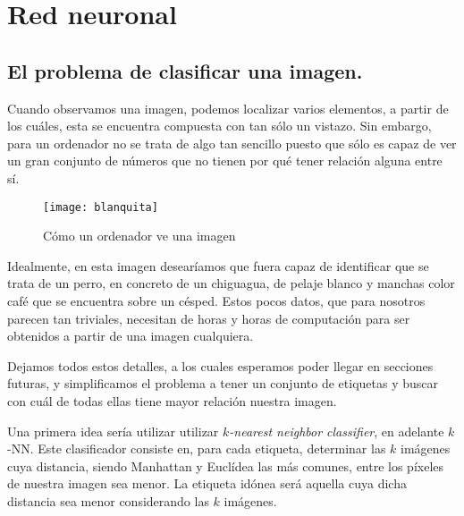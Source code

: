 
\chapter{Red neuronal}
\section{El problema de clasificar una imagen.}

Cuando observamos una imagen, podemos localizar varios elementos, a partir de los cuáles, esta se encuentra compuesta con tan sólo un vistazo. Sin embargo, para un ordenador no se trata de algo tan sencillo puesto que sólo es capaz de ver un gran conjunto de números que no tienen por qué tener relación alguna entre sí.\newline

\begin{figure}[htpb]
  \centering
  \texttt{[image: blanquita]}
  \caption{Cómo un ordenador ve una imagen}
  \label{fig:blanquita}
\end{figure}

Idealmente, en esta imagen desearíamos que fuera capaz de identificar que se trata de un perro, en concreto de un chiguagua, de pelaje blanco y manchas color café que se encuentra sobre un césped. Estos pocos datos, que para nosotros parecen tan triviales, necesitan de horas y horas de computación para ser obtenidos a partir de una imagen cualquiera.\newline

Dejamos todos estos detalles, a los cuales esperamos poder llegar en secciones futuras, y simplificamos el problema a tener un conjunto de etiquetas y buscar con cuál de todas ellas tiene mayor relación nuestra imagen.\newline

Una primera idea sería utilizar utilizar \emph{$k$-nearest neighbor classifier}, en adelante $k$-NN. Este clasificador consiste en, para cada etiqueta, determinar las $k$ imágenes cuya distancia, siendo Manhattan y Euclídea las más comunes, entre los píxeles de nuestra imagen sea menor. La etiqueta idónea será aquella cuya dicha distancia sea menor considerando las $k$ imágenes.\\


